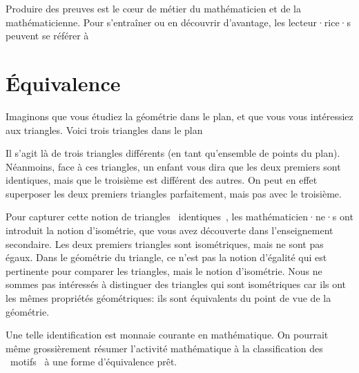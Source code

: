 \documentclass[french,course,oneside,theoremnosection]{lecture}
\newenvironment{further}[1]
{\begin{tcolorbox}[colframe=gray!50, colback=gray!5, arc=0pt, outer arc=0pt, boxrule=0.5pt, title=#1, breakable]}
{\end{tcolorbox}}
\begin{document}
\begin{further}{Pour s'entraîner}
Produire des preuves est le cœur de métier du mathématicien et de la mathématicienne. Pour s'entraîner ou en découvrir d'avantage, les lecteur·rice·s peuvent se référer à \cite{Hammack2003}
\end{further}

\section{Équivalence}

Imaginons que vous étudiez la géométrie dans le plan, et que vous vous intéressiez aux triangles. Voici trois triangles dans le plan
\begin{center}
\end{center}
Il s'agit là de trois triangles différents (en tant qu'ensemble de points du plan). Néanmoins, face à ces triangles, un enfant vous dira que les deux premiers sont identiques, mais que le troisième est différent des autres. On peut en effet superposer les deux premiers triangles parfaitement, mais pas avec le troisième.

Pour capturer cette notion de triangles \og~identiques~\fg, les mathématicien·ne·s ont introduit la notion d'isométrie, que vous avez découverte dans l'enseignement secondaire. Les deux premiers triangles sont isométriques, mais ne sont pas égaux. Dans le géométrie du triangle, ce n'est pas la notion d'égalité qui est pertinente pour comparer les triangles, mais le notion d'isométrie. Nous ne sommes pas intéressés à distinguer des triangles qui sont isométriques car ils ont les mêmes propriétés géométriques: ils sont équivalents du point de vue de la géométrie.

Une telle identification est monnaie courante en mathématique. On pourrait même grossièrement résumer l'activité mathématique à la classification des \og~motifs~\fg{} à une forme d'équivalence prêt.
\end{document}
